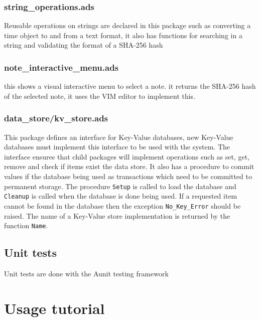 \documentclass[12pt,a4paper]{article}
\newcommand{\codetext}[1]{\colorbox{light-gray}{\texttt{#1}}}
\begin{document}
\subsubsection{string\_operations.ads}
Reusable operations on strings are declared in this package such as converting a time object to and from a text format, it also has functions for searching in a string and validating the format of a SHA-256 hash

\subsubsection{note\_interactive\_menu.ads}
this shows a visual interactive menu to select a note. it returns the SHA-256 hash of the selected note, it uses the VIM editor to implement this.

\subsubsection{data\_store/kv\_store.ads}
This package defines an interface for Key-Value databases, new Key-Value databases must implement this interface to be used with the system. The interface ensures that child packages will implement operations such as set, get, remove and check if items exist the data store. It also has a procedure to commit values if the database being used as transactions which need to be committed to permanent storage. The procedure \codetext{Setup} is called to load the database and \codetext{Cleanup} is called when the database is done being used. If a requested item cannot be found in the database then the exception \codetext{No\_Key\_Error} should be raised. The name of a Key-Value store implementation is returned by the function \codetext{Name}.

\subsection{Unit tests}
Unit tests are done with the Aunit testing framework

\section{Usage tutorial}

%
\end{document}
